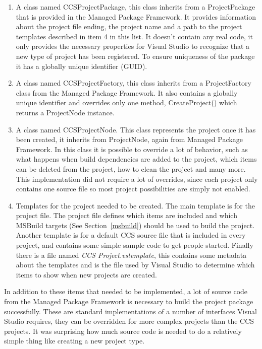 	\begin{enumerate}
		\item A class named \textsf{CCSProjectPackage}, this class inherits from 
		a \textsf{ProjectPackage} that is provided in the Managed Package 
		Framework. It provides information about the project file ending, the 
		project name and a path to the project templates described in item 4 in 
		this list. It doesn't contain any real code, it only provides the 
		necessary properties for Visual Studio to recognize that a new type of 
		project has been registered. To ensure uniqueness of the package it has a 
		globally unique identifier (GUID).
		
		\item A class named \textsf{CCSProjectFactory}, this class inherits from 
		a \textsf{ProjectFactory} class from the Managed Package Framework. It 
		also contains a globally unique identifier and overrides only one method, 
		\textsf{CreateProject()} which returns a \textsf{ProjectNode} instance.
		
		\item A class named \textsf{CCSProjectNode}. This class represents the 
		project once it has been created, it inherits from \textsf{ProjectNode}, 
		again from Managed Package Framework. In this class it is possible to 
		override a lot of behavior, such as what happens when build dependencies 
		are added to the project, which items can be deleted from the project, how 
		to clean the project and many more. This implementation did not require a 
		lot of overrides, since each project only contains one source file so most 
		project possibilities are simply not enabled.
		
		\item Templates for the project needed to be created. The main template is 
		for the project file. The project file defines which items are included 
		and which MSBuild targets (See Section~\ref{msbuild}) should be used to
		build the project. Another template is for a default CCS source file that 
		is included in every project, and contains some simple sample code to get 
		people started. Finally there is a file named \textit{CCS 
		Project.vstemplate}, this contains some metadata about the templates and 
		is the file used by Visual Studio to determine which items to show when 
		new projects are created.
	
	\end{enumerate}
	
	In addition to these items that needed to be implemented, a lot of source 
	code from the Managed Package Framework is necessary to build the project 
	package successfully. These are standard implementations of a number of 
	interfaces Visual Studio requires, they can be overridden for more complex 
	projects than the CCS projects. It was surprising how much source code is 
	needed to do a relatively simple thing like creating a new project type.
	
